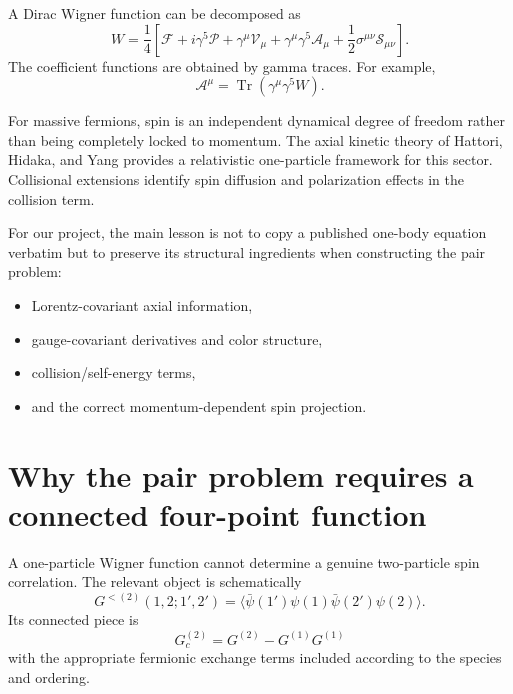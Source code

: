 \documentclass[11pt]{article}
\newcommand{\Trc}{\operatorname{Tr}}
\begin{document}
A Dirac Wigner function can be decomposed as
\begin{equation}
\boxed{
W
=\frac14\left[
\mathcal F
+i\gamma^5\mathcal P
+\gamma^\mu\mathcal V_\mu
+\gamma^\mu\gamma^5\mathcal A_\mu
+\frac12\sigma^{\mu\nu}\mathcal S_{\mu\nu}
\right].
}
\label{eq:clifford}
\end{equation}
The coefficient functions are obtained by gamma traces. For example,
\begin{equation}
\mathcal A^\mu
=\Trc(\gamma^\mu\gamma^5W).
\end{equation}

For massive fermions, spin is an independent dynamical degree of freedom rather than being completely locked to momentum. The axial kinetic theory of Hattori, Hidaka, and Yang provides a relativistic one-particle framework for this sector. Collisional extensions identify spin diffusion and polarization effects in the collision term.

For our project, the main lesson is not to copy a published one-body equation verbatim but to preserve its structural ingredients when constructing the pair problem:

\begin{itemize}[leftmargin=1.5em]
\item Lorentz-covariant axial information,
\item gauge-covariant derivatives and color structure,
\item collision/self-energy terms,
\item and the correct momentum-dependent spin projection.
\end{itemize}

\section{Why the pair problem requires a connected four-point function}

A one-particle Wigner function cannot determine a genuine two-particle spin correlation. The relevant object is schematically
\begin{equation}
G^{<(2)}(1,2;1',2')
=\langle
\bar\psi(1')\psi(1)
\bar\psi(2')\psi(2)
\rangle.
\label{eq:fourpoint}
\end{equation}
Its connected piece is
\begin{equation}
G_c^{(2)}
=G^{(2)}-G^{(1)}G^{(1)}
\end{equation}
with the appropriate fermionic exchange terms included according to the species and ordering.
\end{document}
